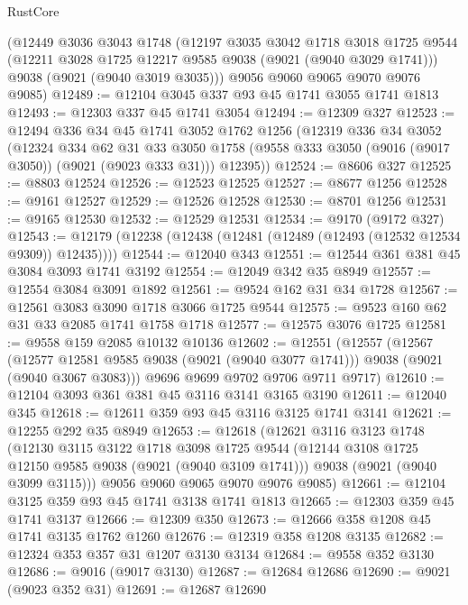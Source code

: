 \begin{lexlean}{RustCore}
\begin{coremodule}
    (@12449
      @3036
      @3043
      @1748
      (@12197
        @3035
        @3042
        @1718
        @3018
        @1725
        @9544
        (@12211 @3028 @1725 @12217 @9585 @9038 (@9021 (@9040 @3029 @1741)))
        @9038
        (@9021 (@9040 @3019 @3035)))
      @9056
      @9060
      @9065
      @9070
      @9076
      @9085)
@12489 := @12104 @3045 @337 @93 @45 @1741 @3055 @1741 @1813
@12493 := @12303 @337 @45 @1741 @3054
@12494 := @12309 @327
@12523 := @12494
    @336
    @34
    @45
    @1741
    @3052
    @1762
    @1256
    (@12319
      @336
      @34
      @3052
      (@12324
        @334
        @62
        @31
        @33
        @3050
        @1758
        (@9558 @333 @3050 (@9016 (@9017 @3050)) (@9021 (@9023 @333 @31)))
        @12395))
@12524 := @8606 @327
@12525 := @8803 @12524
@12526 := @12523 @12525
@12527 := @8677 @1256
@12528 := @9161 @12527
@12529 := @12526 @12528
@12530 := @8701 @1256
@12531 := @9165 @12530
@12532 := @12529 @12531
@12534 := @9170 (@9172 @327)
@12543 := @12179 (@12238 (@12438 (@12481 (@12489 (@12493 (@12532 @12534 @9309)) @12435))))
@12544 := @12040 @343
@12551 := @12544 @361 @381 @45 @3084 @3093 @1741 @3192
@12554 := @12049 @342 @35 @8949
@12557 := @12554 @3084 @3091 @1892
@12561 := @9524 @162 @31 @34 @1728
@12567 := @12561 @3083 @3090 @1718 @3066 @1725 @9544
@12575 := @9523 @160 @62 @31 @33 @2085 @1741 @1758 @1718
@12577 := @12575 @3076 @1725
@12581 := @9558 @159 @2085 @10132 @10136
@12602 := @12551
    (@12557
      (@12567
        (@12577 @12581 @9585 @9038 (@9021 (@9040 @3077 @1741)))
        @9038
        (@9021 (@9040 @3067 @3083)))
      @9696
      @9699
      @9702
      @9706
      @9711
      @9717)
@12610 := @12104 @3093 @361 @381 @45 @3116 @3141 @3165 @3190
@12611 := @12040 @345
@12618 := @12611 @359 @93 @45 @3116 @3125 @1741 @3141
@12621 := @12255 @292 @35 @8949
@12653 := @12618
    (@12621
      @3116
      @3123
      @1748
      (@12130
        @3115
        @3122
        @1718
        @3098
        @1725
        @9544
        (@12144 @3108 @1725 @12150 @9585 @9038 (@9021 (@9040 @3109 @1741)))
        @9038
        (@9021 (@9040 @3099 @3115)))
      @9056
      @9060
      @9065
      @9070
      @9076
      @9085)
@12661 := @12104 @3125 @359 @93 @45 @1741 @3138 @1741 @1813
@12665 := @12303 @359 @45 @1741 @3137
@12666 := @12309 @350
@12673 := @12666 @358 @1208 @45 @1741 @3135 @1762 @1260
@12676 := @12319 @358 @1208 @3135
@12682 := @12324 @353 @357 @31 @1207 @3130 @3134
@12684 := @9558 @352 @3130
@12686 := @9016 (@9017 @3130)
@12687 := @12684 @12686
@12690 := @9021 (@9023 @352 @31)
@12691 := @12687 @12690

\end{coremodule}
\end{lexlean}
